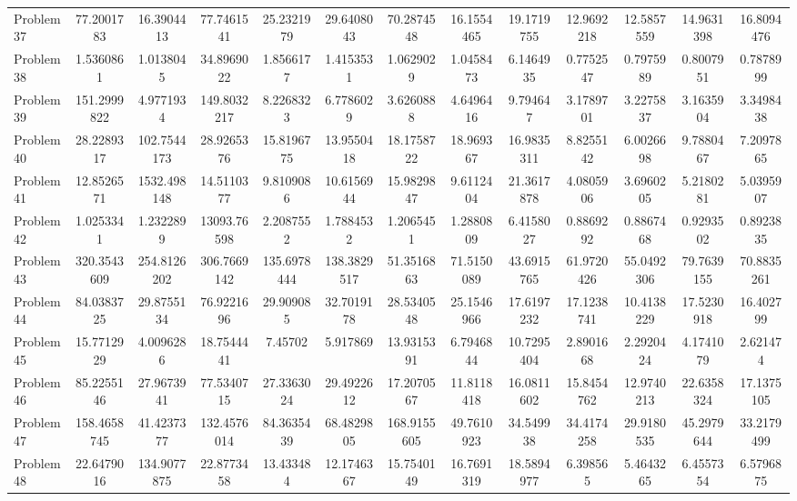 \documentclass[amsmath, amssymb, aps]{revtex4-2}
\begin{document}
\begin{table}[H]
{\begin{tabular}{lcccccccccccc}
Problem 37 & 77.2001783 & 16.3904413 & 77.7461541 & 25.2321979 & 29.6408043 & 70.2874548 & 16.1554465 & 19.1719755 & 12.9692218 & 12.5857559 & 14.9631398 & 16.8094476 \\
Problem 38 & 1.5360861 & 1.0138045 & 34.8969022 & 1.8566177 & 1.4153531 & 1.0629029 & 1.0458473 & 6.1464935 & 0.7752547 & 0.7975989 & 0.8007951 & 0.7878999 \\
Problem 39 & 151.2999822 & 4.9771934 & 149.8032217 & 8.2268323 & 6.7786029 & 3.6260888 & 4.6496416 & 9.794647 & 3.1789701 & 3.2275837 & 3.1635904 & 3.3498438 \\
Problem 40 & 28.2289317 & 102.7544173 & 28.9265376 & 15.8196775 & 13.9550418 & 18.1758722 & 18.969367 & 16.9835311 & 8.8255142 & 6.0026698 & 9.7880467 & 7.2097865 \\
Problem 41 & 12.8526571 & 1532.498148 & 14.5110377 & 9.8109086 & 10.6156944 & 15.9829847 & 9.6112404 & 21.3617878 & 4.0805906 & 3.6960205 & 5.2180281 & 5.0395907 \\
Problem 42 & 1.0253341 & 1.2322899 & 13093.76598 & 2.2087552 & 1.7884532 & 1.2065451 & 1.2880809 & 6.4158027 & 0.8869292 & 0.8867468 & 0.9293502 & 0.8923835 \\
Problem 43 & 320.3543609 & 254.8126202 & 306.7669142 & 135.6978444 & 138.3829517 & 51.3516863 & 71.5150089 & 43.6915765 & 61.9720426 & 55.0492306 & 79.7639155 & 70.8835261 \\
Problem 44 & 84.0383725 & 29.8755134 & 76.9221696 & 29.909085 & 32.7019178 & 28.5340548 & 25.1546966 & 17.6197232 & 17.1238741 & 10.4138229 & 17.5230918 & 16.402799 \\
Problem 45 & 15.7712929 & 4.0096286 & 18.7544441 & 7.45702 & 5.917869 & 13.9315391 & 6.7946844 & 10.7295404 & 2.8901668 & 2.2920424 & 4.1741079 & 2.621474 \\
Problem 46 & 85.2255146 & 27.9673941 & 77.5340715 & 27.3363024 & 29.4922612 & 17.2070567 & 11.8118418 & 16.0811602 & 15.8454762 & 12.9740213 & 22.6358324 & 17.1375105 \\
Problem 47 & 158.4658745 & 41.4237377 & 132.4576014 & 84.3635439 & 68.4829805 & 168.9155605 & 49.7610923 & 34.549938 & 34.4174258 & 29.9180535 & 45.2979644 & 33.2179499 \\
Problem 48 & 22.6479016 & 134.9077875 & 22.8773458 & 13.433484 & 12.1746367 & 15.7540149 & 16.7691319 & 18.5894977 & 6.398565 & 5.4643265 & 6.4557354 & 6.5796875 \\
\hline
\end{tabular}}
\end{table}
\FloatBarrier
\end{document}
